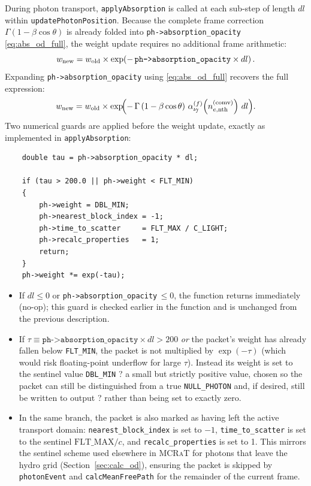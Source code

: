 \documentclass[12pt,a4paper]{article}
\newcommand{\nuf}{\nu_{\!f}}
\newcommand{\code}[1]{\texttt{#1}}
\newcommand{\mcrat}{\textsc{MCRaT}}
\begin{document}
During photon transport, \code{applyAbsorption} is called at each
sub-step of length $dl$ within \code{updatePhotonPosition}.  Because the
complete frame correction $\Gamma(1-\beta\cos\theta)$ is already folded
into \code{ph->absorption\_opacity} \eqref{eq:abs_od_full}, the weight
update requires no additional frame arithmetic:
\begin{equation}
	w_{\rm new} = w_{\rm old}
	\times \exp\!\left(
	-\,\code{ph->absorption\_opacity} \times dl
	\right).
	\label{eq:weight_update_simple}
\end{equation}
Expanding \code{ph->absorption\_opacity} using \eqref{eq:abs_od_full}
recovers the full \citet{abramowicz1991} expression:
\begin{equation}
	w_{\rm new} = w_{\rm old}
	\times \exp\!\Bigl(
	-\,\Gamma\left(1 - \beta\cos\theta\right)
	\,\alpha_{\nuf}^{(f)}\!\left(n_{e,\mathrm{nth}}^{(\mathrm{comv})}\right)
	\,dl
	\Bigr).
	\label{eq:weight_update}
\end{equation}
Two numerical guards are applied before the weight update, exactly as
implemented in \code{applyAbsorption}:
\begin{verbatim}
	double tau = ph->absorption_opacity * dl;
	
	if (tau > 200.0 || ph->weight < FLT_MIN)
	{
		ph->weight = DBL_MIN;
		ph->nearest_block_index = -1;
		ph->time_to_scatter     = FLT_MAX / C_LIGHT;
		ph->recalc_properties   = 1;
		return;
	}
	ph->weight *= exp(-tau);
\end{verbatim}
\begin{itemize}
	\item If $dl \le 0$ or \code{ph->absorption\_opacity}$\,\le 0$,
	the function returns immediately (no-op); this guard is checked
	earlier in the function and is unchanged from the previous
	description.
	\item If $\tau \equiv \code{ph->absorption\_opacity}\times dl > 200$
	\emph{or} the packet's weight has already fallen below
	\code{FLT\_MIN}, the packet is not multiplied by
	$\exp(-\tau)$ (which would risk floating-point underflow for large
	$\tau$). Instead its weight is set to the sentinel value
	\code{DBL\_MIN} ? a small but strictly positive value, chosen so the
	packet can still be distinguished from a true \code{NULL\_PHOTON}
	and, if desired, still be written to output ? rather than being set
	to exactly zero.
	\item In the same branch, the packet is also marked as having left
	the active transport domain: \code{nearest\_block\_index} is set to
	$-1$, \code{time\_to\_scatter} is set to the sentinel
	$\mathrm{FLT\_MAX}/c$, and \code{recalc\_properties} is set to 1.
	This mirrors the sentinel scheme used elsewhere in \mcrat{} for
	photons that leave the hydro grid (Section~\ref{sec:calc_od}),
	ensuring the packet is skipped by \code{photonEvent} and
	\code{calcMeanFreePath} for the remainder of the current frame.
\end{itemize}
\end{document}
